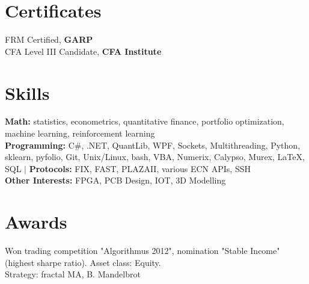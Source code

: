 \documentclass[a4paper,hidelinks]{article}
\newcommand{\resumeSubHeadingListStart}{\begin{itemize}[leftmargin=0.15in, label={}]}
\newcommand{\resumeSubHeadingListEnd}{\end{itemize}}
\begin{document}

\vspace{-2pt}
\section{Certificates}
\resumeSubHeadingListStart
\small{\item{
{FRM Certified, \textbf{{GARP}}} \\ %
{CFA Level III Candidate, \textbf{{CFA Institute}}} %
}}
\resumeSubHeadingListEnd

\vspace{-9pt}
\section{Skills}
\resumeSubHeadingListStart
\small{\item{
              \textbf{{Math:}}{ statistics, econometrics, quantitative finance, portfolio optimization, machine learning, reinforcement learning\\} %
              \textbf{{Programming:}}{ C\#, .NET, QuantLib, WPF, Sockets, Multithreading, Python, sklearn, pyfolio, Git, Unix/Linux, bash, VBA, Numerix, Calypso, Murex, \LaTeX, SQL} $|$ %
              \textbf{{Protocols:}}{ FIX, FAST, PLAZAII, various ECN APIs, SSH \\} %
              \textbf{{Other Interests:}}{ FPGA, PCB Design, IOT, 3D Modelling} %
        }}

\resumeSubHeadingListEnd
\vspace{-11pt}
\section{Awards}
\begin{description}%
  \item{Won trading competition "Algorithmus 2012", nomination "Stable Income" (highest sharpe ratio). Asset class: Equity.\\Strategy: fractal MA, B. Mandelbrot}
  \vspace{-5pt}
\end{description}
\end{document}
